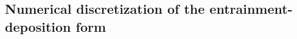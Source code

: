 \documentclass{deltares_report_elv}
\begin{document}
\subsection{Numerical discretization of the entrainment-deposition form}
\label{sec:exner_ed}

\section{\codeLaUpdate{}}
\label{sec:codeLaUpdate}

\section{\codeGSDUpdate{}}
\label{sec:codeGSDUpdate}

\section{\codeFrictionUpdate{}}
\label{sec:codeFrictionUpdate}

\section{\codeResultsWriting{}}
\label{sec:codeResultsWriting}

\section{\codeTimeStep{}}
\label{sec:codeTimeStep}

\section{\codeFinal{}}
\label{sec:codeFinal}
\end{document}
